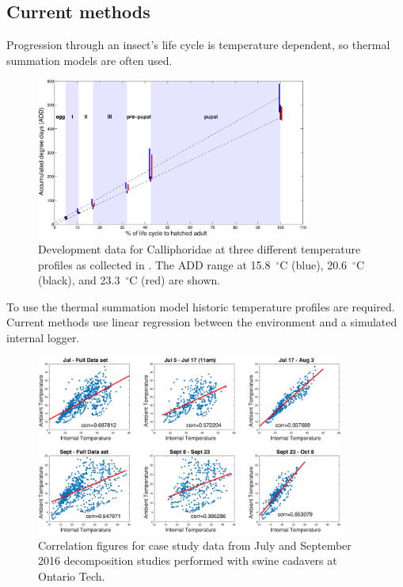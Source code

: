 \documentclass{beamer}
\begin{document}
\subsection{Current methods}
\begin{frame}
Progression through an insect's life cycle is temperature dependent,
so thermal summation models are often used.
\begin{figure}
 \includegraphics[width=0.8\textwidth]{Figures/anderson}
  \caption{Development data for Calliphoridae at three different temperature
profiles as collected in . The ADD range at
15.8~$^\circ$\textsf{C} (blue), 20.6~$^\circ$\textsf{C} (black), and 23.3~$^\circ$\textsf{C} (red)
are shown.  }
\end{figure}
\end{frame}

\begin{frame}
  To use the thermal summation model historic temperature
  profiles are required. Current methods use linear regression between
  the environment and a simulated internal logger.
  \begin{figure}
    \includegraphics[width=0.9\textwidth]{Figures/correlation}
    \caption{Correlation figures for case study data from July and
      September 2016 decomposition studies performed with swine
      cadavers at Ontario Tech.}
  \end{figure}
\end{frame}
\end{document}
